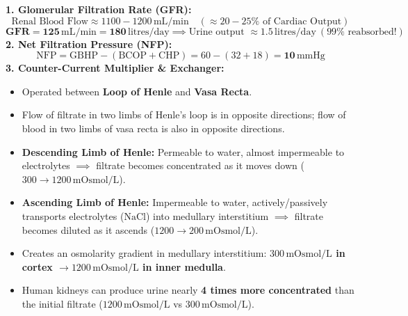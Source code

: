\documentclass[10pt,a4paper]{article}
\begin{document}
\begin{formulabox}
\textbf{1. Glomerular Filtration Rate (GFR):}
\begin{equation}
  \text{Renal Blood Flow} \approx 1100-1200\,\mathrm{mL/min} \quad (\approx 20-25\% \text{ of Cardiac Output})
\end{equation}
\begin{equation}
  \mathbf{GFR = 125\,\mathrm{mL/min} = 180\,\mathrm{litres/day}} \implies \text{Urine output } \approx \mathbf{1.5\,\mathrm{litres/day}} \ (99\% \text{ reabsorbed!})
\end{equation}
\textbf{2. Net Filtration Pressure (NFP):}
\begin{equation}
  \mathrm{NFP = GBHP - (BCOP + CHP)} = 60 - (32 + 18) = \mathbf{10\,\mathrm{mmHg}}
\end{equation}
\textbf{3. Counter-Current Multiplier \& Exchanger:}
\begin{itemize}
  \item Operated between \textbf{Loop of Henle} and \textbf{Vasa Recta}.
  \item Flow of filtrate in two limbs of Henle's loop is in opposite directions; flow of blood in two limbs of vasa recta is also in opposite directions.
  \item \textbf{Descending Limb of Henle:} Permeable to water, almost impermeable to electrolytes $\implies$ filtrate becomes concentrated as it moves down ($300 \to 1200\,\mathrm{mOsmol/L}$).
  \item \textbf{Ascending Limb of Henle:} Impermeable to water, actively/passively transports electrolytes ($\mathrm{NaCl}$) into medullary interstitium $\implies$ filtrate becomes diluted as it ascends ($1200 \to 200\,\mathrm{mOsmol/L}$).
  \item Creates an osmolarity gradient in medullary interstitium: \textbf{$300\,\mathrm{mOsmol/L}$ in cortex $\to 1200\,\mathrm{mOsmol/L}$ in inner medulla}.
  \item Human kidneys can produce urine nearly \textbf{4 times more concentrated} than the initial filtrate ($1200\,\mathrm{mOsmol/L}$ vs $300\,\mathrm{mOsmol/L}$).
\end{itemize}
\end{formulabox}
\end{document}
